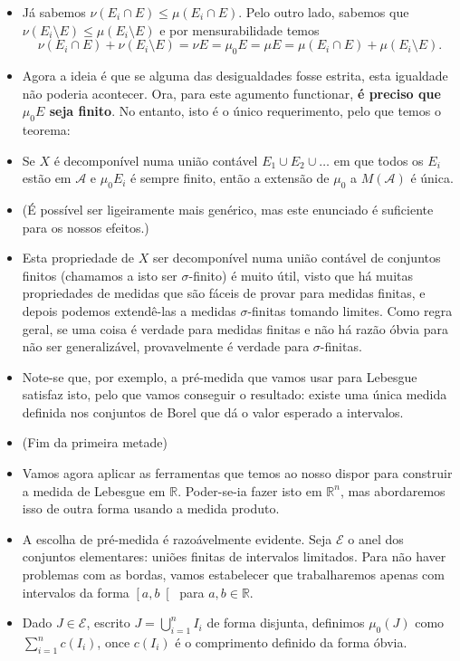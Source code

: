 \documentclass{article}
\newcommand{\R}{\mathbb{R}}
\begin{document}
\begin{itemize}
\item Já sabemos $\nu(E_i \cap E) \leq \mu(E_i \cap E)$. Pelo outro lado, sabemos que $\nu(E_i \setminus E) \leq \mu(E_i \setminus E)$ e por mensurabilidade temos
\[\nu(E_i \cap E) + \nu(E_i \setminus E) = \nu E = \mu_0 E = \mu E = \mu(E_i \cap E) + \mu(E_i \setminus E).\]
\item Agora a ideia é que se alguma das desigualdades fosse estrita, esta igualdade não poderia acontecer. Ora, para este agumento functionar, \textbf{é preciso que $\mu_0 E$ seja finito}. No entanto, isto é o único requerimento, pelo que temos o teorema:
\item Se $X$ é decomponível numa união contável $E_1 \cup E_2 \cup \dots$ em que todos os $E_i$ estão em $\mathcal A$ e $\mu_0 E_i$ é sempre finito, então a extensão de $\mu_0$ a $M(\mathcal A)$ é única.
\item (É possível ser ligeiramente mais genérico, mas este enunciado é suficiente para os nossos efeitos.)
\item Esta propriedade de $X$ ser decomponível numa união contável de conjuntos finitos (chamamos a isto ser $\sigma$-finito) é muito útil, visto que há muitas propriedades de medidas que são fáceis de provar para medidas finitas, e depois podemos extendê-las a medidas $\sigma$-finitas tomando limites. Como regra geral, se uma coisa é verdade para medidas finitas e não há razão óbvia para não ser generalizável, provavelmente é verdade para $\sigma$-finitas.
\item Note-se que, por exemplo, a pré-medida que vamos usar para Lebesgue satisfaz isto, pelo que vamos conseguir o resultado: existe uma única medida definida nos conjuntos de Borel que dá o valor esperado a intervalos.
\item (Fim da primeira metade)
\item Vamos agora aplicar as ferramentas que temos ao nosso dispor para construir a medida de Lebesgue em $\R$. Poder-se-ia fazer isto em $\R^n$, mas abordaremos isso de outra forma usando a medida produto.
\item A escolha de pré-medida é razoávelmente evidente. Seja $\mathcal E$ o anel dos conjuntos elementares: uniões finitas de intervalos limitados. Para não haver problemas com as bordas, vamos estabelecer que trabalharemos apenas com intervalos da forma $\left[a,b\right[$ para $a,b \in \R$.
\item Dado $J \in \mathcal E$, escrito $J = \bigcup_{i=1}^n I_i$ de forma disjunta, definimos $\mu_0(J)$ como $\sum_{i=1}^n c(I_i)$, once $c(I_i)$ é o comprimento definido da forma óbvia.

\end{itemize}
\end{document}
